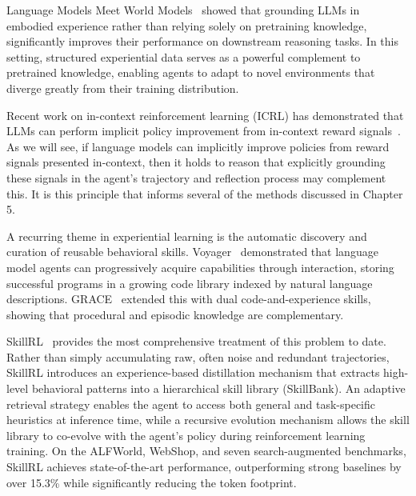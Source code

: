 Language Models Meet World Models~\citep{xiang2023embodied} showed that grounding LLMs in embodied experience rather than relying solely on pretraining knowledge, significantly improves their performance on downstream reasoning tasks. In this setting, structured experiential data serves as a powerful complement to pretrained knowledge, enabling agents to adapt to novel environments that diverge greatly from their training distribution.

Recent work on in-context reinforcement learning (ICRL) has demonstrated that LLMs can perform implicit policy improvement from in-context reward signals~\citep{song2025icrl, karten2025economist}. As we will see, if language models can implicitly improve policies from reward signals presented in-context, then it holds to reason that explicitly grounding these signals in the agent's trajectory and reflection process may complement this. It is this principle that informs several of the methods discussed in Chapter 5. 

 A recurring theme in experiential learning is the automatic discovery and curation of reusable behavioral skills. Voyager~\citep{wang2023voyager} demonstrated that language model agents can progressively acquire capabilities through interaction, storing successful programs in a growing code library indexed by natural language descriptions. GRACE~\citep{song2024grace} extended this with dual code-and-experience skills, showing that procedural and episodic knowledge are complementary.

SkillRL~\citep{xia2026skillrl} provides the most comprehensive treatment of this problem to date. Rather than simply accumulating raw, often noise and redundant trajectories, SkillRL introduces an experience-based distillation mechanism that extracts high-level behavioral patterns into a hierarchical skill library (SkillBank). An adaptive retrieval strategy enables the agent to access both general and task-specific heuristics at inference time, while a recursive evolution mechanism allows the skill library to co-evolve with the agent's policy during reinforcement learning training. On the ALFWorld, WebShop, and seven search-augmented benchmarks, SkillRL achieves state-of-the-art performance, outperforming strong baselines by over 15.3\% while significantly reducing the token footprint. 

